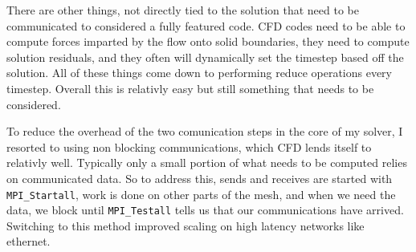 \documentclass[12pt,parskip=full]{article}
\numberwithin{subsection}{section}
\begin{document}
		\begin{figure}[H]
			\centering
			\begin{subfigure}[H]{0.6\textwidth}
			\end{subfigure}
			\begin{subfigure}[H]{0.6\textwidth}
			\end{subfigure}
		\end{figure}
		There are other things, not directly tied to the solution that need to be communicated to considered a fully featured code.
		CFD codes need to be able to compute forces imparted by the flow onto solid boundaries, they need to compute solution residuals,
		and they often will dynamically set the timestep based off the solution. All of these things come down to performing reduce
		operations every timestep. Overall this is relativly easy but still something that needs to be considered.

		To reduce the overhead of the two comunication steps in the core of my solver, I resorted to using non blocking communications,
		which CFD lends itself to relativly well. Typically only a small portion of what needs to be computed relies on communicated data.
		So to address this, sends and receives are started with \verb|MPI_Startall|, work is done on other parts of the mesh, and when we
		need the data, we block until \verb|MPI_Testall| tells us that our communications have arrived. Switching to this method improved scaling
		on high latency networks like ethernet.
\end{document}
